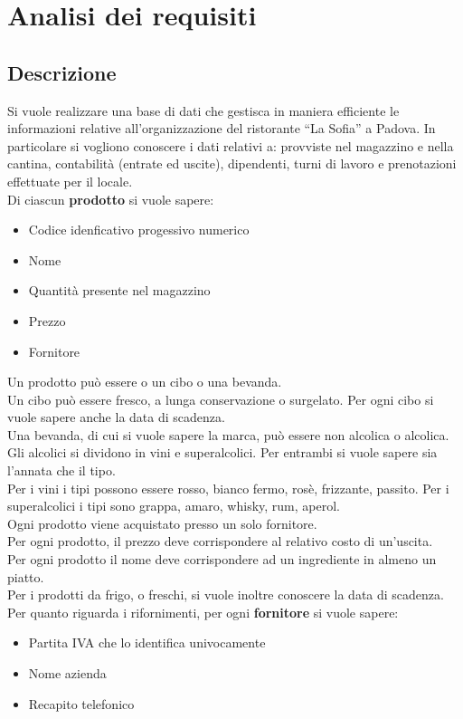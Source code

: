 \section{Analisi dei requisiti} 
\subsection{Descrizione}
Si vuole realizzare una base di dati che gestisca in maniera efficiente le informazioni relative all’organizzazione del ristorante “La Sofia” a Padova. \newline
In particolare si vogliono conoscere i dati relativi a: provviste nel magazzino e nella cantina, contabilità (entrate ed uscite), dipendenti, turni di lavoro e prenotazioni effettuate per il locale. \medskip \\
Di ciascun \textbf{prodotto} si vuole sapere:
\begin{itemize}
    \item Codice idenficativo progessivo numerico
    \item Nome
    \item Quantità presente nel magazzino
    \item Prezzo
    \item Fornitore
\end{itemize}
Un prodotto può essere o un cibo o una bevanda. \\
Un cibo può essere fresco, a lunga conservazione o surgelato. Per ogni cibo si vuole sapere anche la data di scadenza. \\
Una bevanda, di cui si vuole sapere la marca, può essere non alcolica o alcolica. Gli alcolici si dividono in vini e superalcolici. Per entrambi si vuole sapere sia l’annata che il tipo. \\
Per i vini i tipi possono essere rosso, bianco fermo, rosè, frizzante, passito. Per i superalcolici i tipi sono grappa, amaro, whisky, rum, aperol.\\
Ogni prodotto viene acquistato presso un solo fornitore.\\
Per ogni prodotto, il prezzo deve corrispondere al relativo costo di un'uscita. \\
Per ogni prodotto il nome deve corrispondere ad un ingrediente in almeno un piatto. \\
Per i prodotti da frigo, o freschi, si vuole inoltre conoscere la data di scadenza. \medskip \\
Per quanto riguarda i rifornimenti, per ogni \textbf{fornitore} si vuole sapere:
\begin{itemize}
    \item Partita IVA che lo identifica univocamente
    \item Nome azienda
    \item Recapito telefonico
\end{itemize}
